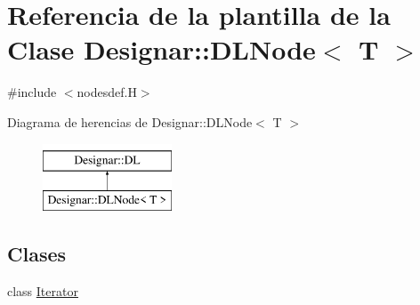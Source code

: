 \hypertarget{class_designar_1_1_d_l_node}{}\section{Referencia de la plantilla de la Clase Designar\+:\+:D\+L\+Node$<$ T $>$}
\label{class_designar_1_1_d_l_node}


{\ttfamily \#include $<$nodesdef.\+H$>$}

Diagrama de herencias de Designar\+:\+:D\+L\+Node$<$ T $>$\begin{figure}[H]
\begin{center}
\leavevmode
\includegraphics[height=2.000000cm]{class_designar_1_1_d_l_node}
\end{center}
\end{figure}
\subsection*{Clases}
\begin{DoxyCompactItemize}
\item 
class \hyperlink{class_designar_1_1_d_l_node_1_1_iterator}{Iterator}
\end{DoxyCompactItemize}
